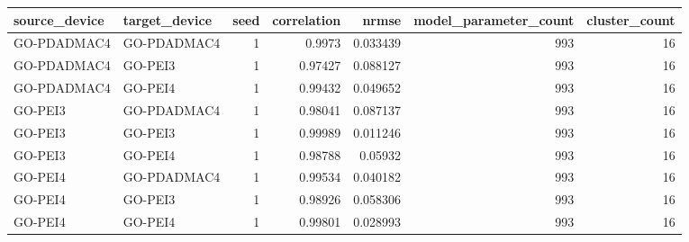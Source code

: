 \begin{tabular}{llrrrrr}
\toprule
source\_device & target\_device & seed & correlation & nrmse & model\_parameter\_count & cluster\_count \\
\midrule
GO-PDADMAC4 & GO-PDADMAC4 & 1 & 0.9973 & 0.033439 & 993 & 16 \\
GO-PDADMAC4 & GO-PEI3 & 1 & 0.97427 & 0.088127 & 993 & 16 \\
GO-PDADMAC4 & GO-PEI4 & 1 & 0.99432 & 0.049652 & 993 & 16 \\
GO-PEI3 & GO-PDADMAC4 & 1 & 0.98041 & 0.087137 & 993 & 16 \\
GO-PEI3 & GO-PEI3 & 1 & 0.99989 & 0.011246 & 993 & 16 \\
GO-PEI3 & GO-PEI4 & 1 & 0.98788 & 0.05932 & 993 & 16 \\
GO-PEI4 & GO-PDADMAC4 & 1 & 0.99534 & 0.040182 & 993 & 16 \\
GO-PEI4 & GO-PEI3 & 1 & 0.98926 & 0.058306 & 993 & 16 \\
GO-PEI4 & GO-PEI4 & 1 & 0.99801 & 0.028993 & 993 & 16 \\
\bottomrule
\end{tabular}
